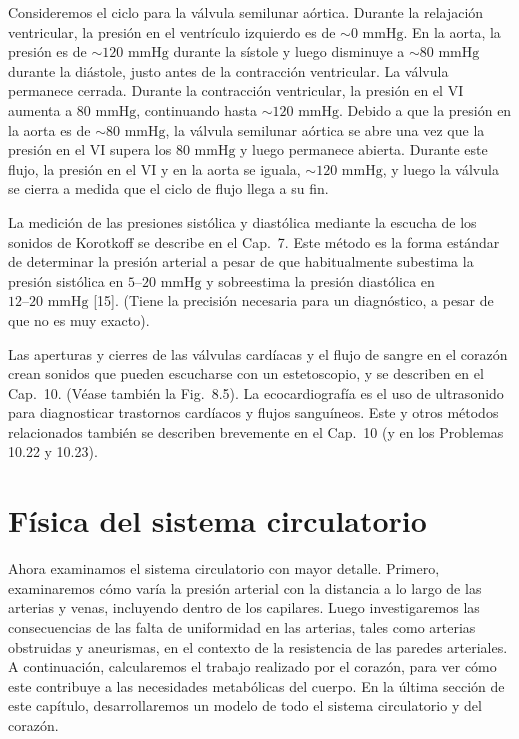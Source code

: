 \documentclass[12pt]{book}
\begin{document}
Consideremos el ciclo para la válvula semilunar aórtica. Durante la relajación ventricular, la presión en el ventrículo izquierdo es de ${\sim}0\text{ mmHg}$. En la aorta, la presión es de ${\sim}120\text{ mmHg}$ durante la sístole y luego disminuye a ${\sim}80\text{ mmHg}$ durante la diástole, justo antes de la contracción ventricular. La válvula permanece cerrada. Durante la contracción ventricular, la presión en el VI aumenta a $80\text{ mmHg}$, continuando hasta ${\sim}120\text{ mmHg}$. Debido a que la presión en la aorta es de ${\sim}80\text{ mmHg}$, la válvula semilunar aórtica se abre una vez que la presión en el VI supera los $80\text{ mmHg}$ y luego permanece abierta. Durante este flujo, la presión en el VI y en la aorta se iguala, ${\sim}120\text{ mmHg}$, y luego la válvula se cierra a medida que el ciclo de flujo llega a su fin.

La medición de las presiones sistólica y diastólica mediante la escucha de los sonidos de Korotkoff se describe en el Cap.~7. Este método es la forma estándar de determinar la presión arterial a pesar de que habitualmente subestima la presión sistólica en $5\text{--}20\text{ mmHg}$ y sobreestima la presión diastólica en $12\text{--}20\text{ mmHg}$ [15]. (Tiene la precisión necesaria para un diagnóstico, a pesar de que no es muy exacto).

Las aperturas y cierres de las válvulas cardíacas y el flujo de sangre en el corazón crean sonidos que pueden escucharse con un estetoscopio, y se describen en el Cap.~10. (Véase también la Fig.~8.5). La ecocardiografía es el uso de ultrasonido para diagnosticar trastornos cardíacos y flujos sanguíneos. Este y otros métodos relacionados también se describen brevemente en el Cap.~10 (y en los Problemas 10.22 y 10.23).

\section{Física del sistema circulatorio}

Ahora examinamos el sistema circulatorio con mayor detalle. Primero, examinaremos cómo varía la presión arterial con la distancia a lo largo de las arterias y venas, incluyendo dentro de los capilares. Luego investigaremos las consecuencias de las falta de uniformidad en las arterias, tales como arterias obstruidas y aneurismas, en el contexto de la resistencia de las paredes arteriales. A continuación, calcularemos el trabajo realizado por el corazón, para ver cómo este contribuye a las necesidades metabólicas del cuerpo. En la última sección de este capítulo, desarrollaremos un modelo de todo el sistema circulatorio y del corazón.
\end{document}
